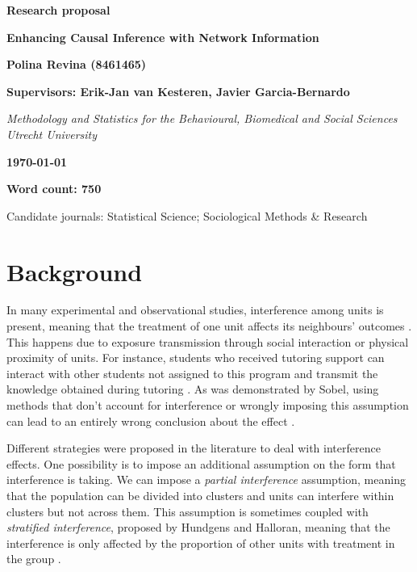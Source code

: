 \documentclass[a4paper,11pt]{article}
\begin{document}
\begin{titlepage}
    \centering
    \vspace*{2cm}
    
    \textbf{\Large Research proposal}
    
    \vspace{2cm}
    
    \textbf{\Huge Enhancing Causal Inference with Network Information}
    
    \vfill
    
    \textbf{Polina Revina (8461465)}
    
    \vspace{0.5cm}
    
    \textbf{Supervisors: Erik-Jan van Kesteren, Javier Garcia-Bernardo}
    
    \vspace{0.5cm}
    
    \textit{Methodology and Statistics for the Behavioural, Biomedical and Social Sciences\\
    Utrecht University}
    
    \vfill
    \textbf{\today}
    \vspace{0.5cm}
    
    \textbf{Word count: 750}
    \vspace{0.5cm}
    
    Candidate journals: Statistical Science; Sociological Methods \& Research
    
\end{titlepage}

\section{Background}

In many experimental and observational studies, interference among units is present, meaning that the treatment of one unit affects its neighbours’ outcomes \cite{cox1958planning}. This happens due to exposure transmission through social interaction or physical proximity of units. For instance, students who received tutoring support can interact with other students not assigned to this program and transmit the knowledge obtained during tutoring \cite{forastiere2021identification}. As was demonstrated by Sobel, using methods that don’t account for interference or wrongly imposing this assumption can lead to an entirely wrong conclusion about the effect \cite{sobel2006randomized}.

Different strategies were proposed in the literature to deal with interference effects. One possibility is to impose an additional assumption on the form that interference is taking. We can impose a \textit{partial interference} assumption, meaning that the population can be divided into clusters and units can interfere within clusters but not across them. This assumption is sometimes coupled with \textit{stratified interference}, proposed by Hundgens and Halloran, meaning that the interference is only affected by the proportion of other units with treatment in the group \cite{hudgens2008toward}. 
\end{document}
